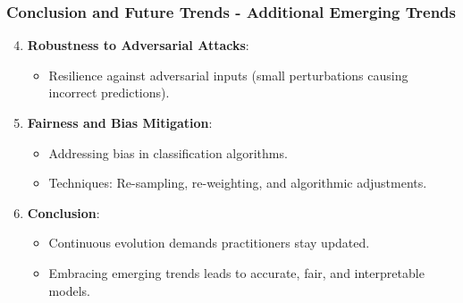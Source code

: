 \documentclass{beamer}
\begin{document}
\begin{frame}[fragile]
    \frametitle{Conclusion and Future Trends - Additional Emerging Trends}
    
    \begin{enumerate}
        \setcounter{enumi}{3}
        \item \textbf{Robustness to Adversarial Attacks}:
            \begin{itemize}
                \item Resilience against adversarial inputs (small perturbations causing incorrect predictions).
            \end{itemize}
        
        \item \textbf{Fairness and Bias Mitigation}:
            \begin{itemize}
                \item Addressing bias in classification algorithms.
                \item Techniques: Re-sampling, re-weighting, and algorithmic adjustments.
            \end{itemize}
        
        \item \textbf{Conclusion}:
            \begin{itemize}
                \item Continuous evolution demands practitioners stay updated.
                \item Embracing emerging trends leads to accurate, fair, and interpretable models.
            \end{itemize}
    \end{enumerate}
\end{frame}
\end{document}
